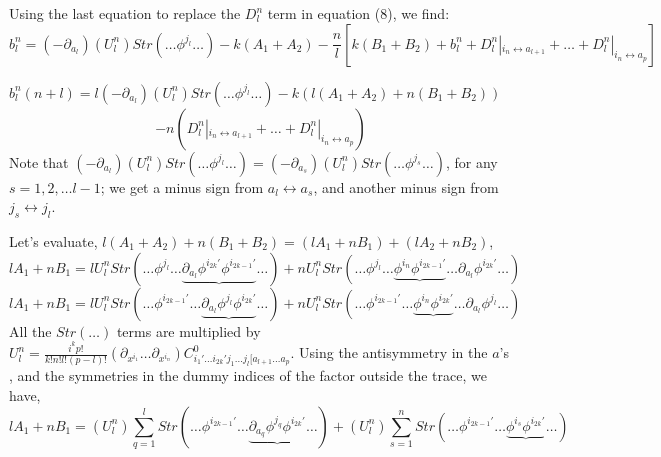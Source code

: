 \documentclass[a4paper,12pt]{article}
\begin{document}
Using the last equation to replace the $D^n_l$ term in equation (8), we find:
\begin{equation}
b^n_l=(-\partial_{ a_l})(U^n_l)Str\left(\ldots \phi^{j_l}\ldots \right)-k(A_1+A_2)-\frac{n}{l}[ k(B_1+B_2)+b^n_l+D^n_l|_{i_n\leftrightarrow a_{l+1}}+\ldots +D^n_l|_{i_n\leftrightarrow a_p}]
\end{equation}

$b^n_l(n+l)=l(-\partial_{a_l})(U^n_l)Str\left(\ldots \phi^{j_l}\ldots \right)-k(l(A_1+A_2)+n(B_1+B_2)) $
\begin{equation}
-n(D^n_l|_{i_n\leftrightarrow a_{l+1}}+\ldots +D^n_l|_{i_n\leftrightarrow a_p})
\end{equation}
Note that $(-\partial_{a_l})(U^n_l) Str\left(\ldots \phi^{j_l}\ldots \right)=(-\partial_{a_s}) (U^n_l) Str\left(\ldots \phi^{j_s}\ldots \right)$, for any $s=1,2,\ldots l-1$; we get a minus sign from $a_l \leftrightarrow a_s$, and another minus sign from $j_s \leftrightarrow j_l$.

Let's evaluate,  $ l(A_1+A_2)+n(B_1+B_2)= (lA_1+nB_1)+(lA_2+nB_2)$,
\begin{equation}
lA_1+nB_1= l U^n_l Str\left(\ldots \phi^{j_l}\ldots \underbrace{\partial_{a_l}\phi^{i_{2k}'}\phi^{i_{2k-1}'}}\ldots \right)+n U^n_l Str\left(\ldots \phi^{j_l}\ldots \underbrace{\phi^{i_n}\phi^{i_{2k-1}'}}\ldots \partial_{a_l}\phi^{i_{2k}'}\ldots \right)
\end{equation}
\begin{equation}
lA_1+nB_1= l U^n_l Str\left(\ldots \phi^{i_{2k-1}'}\ldots \underbrace{\partial_{a_l}\phi^{j_l}\phi^{i_{2k}'}}\ldots \right)+n U^n_l Str\left(\ldots \phi^{i_{2k-1}'}\ldots \underbrace{\phi^{i_n}\phi^{i_{2k}'}}\ldots \partial_{a_l}\phi^{j_l}\ldots \right)
\end{equation}
 All the $Str\left(\ldots\right)$ terms are multiplied by $U^n_l=\frac{i^kp!}{k!n!l!(p-l)!}\left(\partial_{x^{i_1}}\ldots \partial_{x^{i_n}}\right) C^0_{i_1'\ldots i_{2k}'j_1\ldots j_l[a_{l+1}\ldots a_p}$.\newline
Using the antisymmetry in the $a$'s , and the symmetries in the dummy indices of the factor outside the trace, we have,
\begin{equation}
lA_1+nB_1=(U^n_l)\sum_{q=1}^{l} Str\left(\ldots \phi^{i_{2k-1}'}\ldots \underbrace{\partial_{a_q}\phi^{j_q}\phi^{i_{2k}'}}\ldots \right)+(U^n_l)\sum_{s=1}^{n} Str\left(\ldots \phi^{i_{2k-1}'}\ldots \underbrace{\phi^{i_s}\phi^{i_{2k}'}}\ldots \right)
\end{equation}
\end{document}
